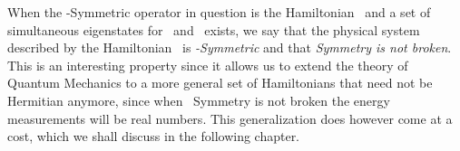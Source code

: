         When the \PT-Symmetric operator in question is the Hamiltonian \hH\ and a set of simultaneous eigenstates for \hH\ and \hPT\ exists, we say that the physical system described by the Hamiltonian \hH\ is \emph{\PT-Symmetric} and that \emph{\PT Symmetry is not broken}. This is an interesting property since it allows us to extend the theory of Quantum Mechanics to a more general set of Hamiltonians that need not be Hermitian anymore, since when \PT\ Symmetry is not broken the energy measurements will be real numbers. This generalization does however come at a cost, which we shall discuss in the following chapter.
